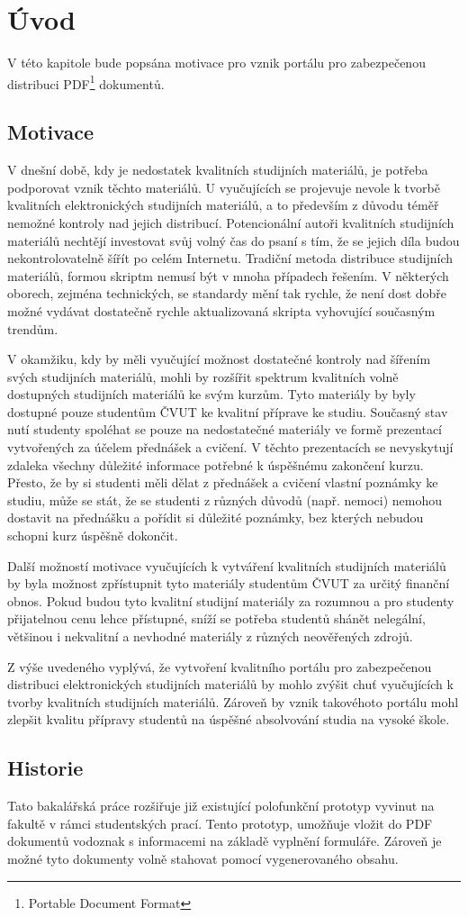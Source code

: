 \chapter{Úvod}
V této kapitole bude popsána motivace pro vznik portálu pro zabezpečenou distribuci PDF\footnote{Portable Document Format} dokumentů.

\section{Motivace}
V dnešní době, kdy je nedostatek kvalitních studijních materiálů, je potřeba podporovat vznik těchto materiálů. U vyučujících se projevuje nevole k tvorbě kvalitních elektronických studijních materiálů, a to především z důvodu téměř nemožné kontroly nad jejich distribucí. Potencionální autoři kvalitních studijních materiálů nechtějí investovat svůj volný čas do psaní s tím, že se jejich díla budou nekontrolovatelně šířít po celém Internetu. Tradiční metoda distribuce studijních materiálů, formou skriptm nemusí být v mnoha případech řešením. V některých oborech, zejména technických, se standardy mění tak rychle, že není dost dobře možné vydávat dostatečně rychle aktualizovaná skripta vyhovující současným trendům.

V okamžiku, kdy by měli vyučující možnost dostatečné kontroly nad šířením svých studijních materiálů, mohli by rozšířit spektrum kvalitních volně dostupných studijních materiálů ke svým kurzům. Tyto materiály by byly dostupné pouze studentům ČVUT ke kvalitní příprave ke studiu. Současný stav nutí studenty spoléhat se pouze na nedostatečné materiály ve formě prezentací vytvořených za účelem přednášek a cvičení. V těchto prezentacích se nevyskytují zdaleka všechny důležité informace potřebné k úspěšnému zakončení kurzu. Přesto, že by si studenti měli dělat z přednášek a cvičení vlastní poznámky ke studiu, může se stát, že se studenti z různých důvodů (např. nemoci) nemohou dostavit na přednášku a pořídit si důležité poznámky, bez kterých nebudou schopni kurz úspěšně dokončit.

Další možností motivace vyučujících k vytváření kvalitních studijních materiálů by byla možnost zpřístupnit tyto materiály studentům ČVUT za určitý finanční obnos. Pokud budou tyto kvalitní studijní materiály za rozumnou a pro studenty přijatelnou cenu lehce přístupné, sníží se potřeba studentů shánět nelegální, většinou i nekvalitní a nevhodné materiály z různých neověřených zdrojů.

Z výše uvedeného vyplývá, že vytvoření kvalitního portálu pro zabezpečenou distribuci elektronických studijních materiálů by mohlo zvýšit chuť vyučujících k tvorby kvalitních studijních materiálů. Zároveň by vznik takovéhoto portálu mohl zlepšit kvalitu přípravy studentů na úspěšné absolvování studia na vysoké škole.  

\section{Historie}
Tato bakalářská práce rozšiřuje již existující polofunkční prototyp vyvinut na fakultě v rámci studentských prací. Tento prototyp, umožňuje vložit do PDF dokumentů vodoznak s informacemi na základě vyplnění formuláře. Zároveň je možné tyto dokumenty volně stahovat pomocí vygenerovaného obsahu.
